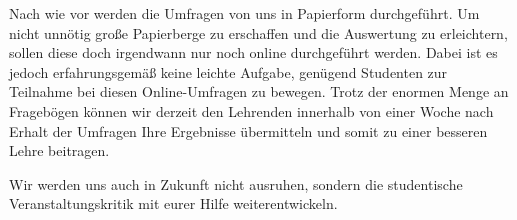 \begin{multicols}{2}
Nach wie vor werden die Umfragen von uns in Papierform durchgeführt. Um nicht unnötig große Papierberge zu erschaffen und die Auswertung zu erleichtern, sollen diese doch irgendwann nur noch online durchgeführt werden. Dabei ist es jedoch erfahrungsgemäß keine leichte Aufgabe, genügend Studenten zur Teilnahme bei diesen Online-Umfragen zu bewegen. Trotz der enormen Menge an Fragebögen können wir derzeit den Lehrenden innerhalb von einer Woche nach Erhalt der Umfragen Ihre Ergebnisse übermitteln und somit zu einer besseren Lehre beitragen.

Wir werden uns auch in Zukunft nicht ausruhen, sondern die studentische Veranstaltungskritik mit eurer Hilfe weiterentwickeln. 

\end{multicols}

